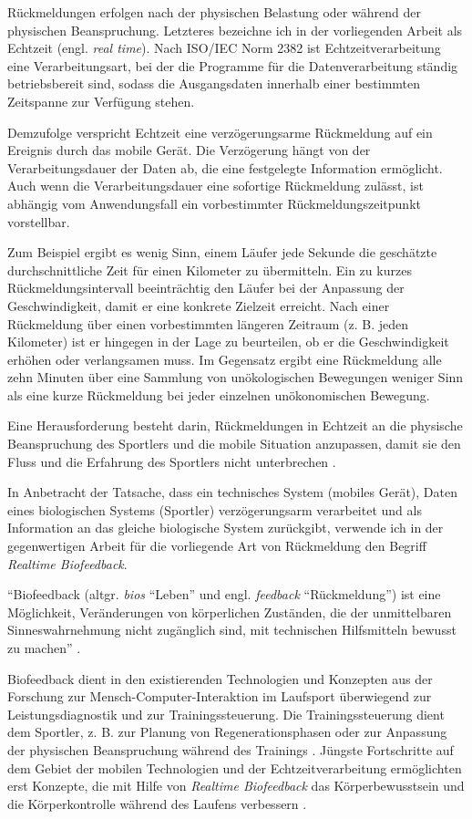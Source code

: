 Rückmeldungen erfolgen nach der physischen Belastung oder während der physischen Beanspruchung. Letzteres bezeichne ich in der vorliegenden Arbeit als Echtzeit (engl. \emph{real time}). Nach ISO/IEC Norm 2382 ist Echtzeitverarbeitung eine Verarbeitungsart, bei der die Programme für die Datenverarbeitung ständig betriebsbereit sind, sodass die Ausgangsdaten innerhalb einer bestimmten Zeitspanne zur Verfügung stehen.

Demzufolge verspricht Echtzeit eine verzögerungsarme Rückmeldung auf ein Ereignis durch das mobile Gerät. Die Verzögerung hängt von der Verarbeitungsdauer der Daten ab, die eine festgelegte Information ermöglicht. Auch wenn die Verarbeitungsdauer eine sofortige Rückmeldung zulässt, ist abhängig vom Anwendungsfall ein vorbestimmter Rückmeldungszeitpunkt vorstellbar.

Zum Beispiel ergibt es wenig Sinn, einem Läufer jede Sekunde die geschätzte durchschnittliche Zeit für einen Kilometer zu übermitteln. Ein zu kurzes Rückmeldungsintervall beeinträchtig den Läufer bei der Anpassung der Geschwindigkeit, damit er eine konkrete Zielzeit erreicht. Nach einer Rückmeldung über einen vorbestimmten längeren Zeitraum (z. B. jeden Kilometer) ist er hingegen in der Lage zu beurteilen, ob er die Geschwindigkeit erhöhen oder verlangsamen muss. Im Gegensatz ergibt eine Rückmeldung alle zehn Minuten über eine Sammlung von unökologischen Bewegungen weniger Sinn als eine kurze Rückmeldung bei jeder einzelnen unökonomischen Bewegung.

Eine Herausforderung besteht darin, Rückmeldungen in Echtzeit an die physische Beanspruchung des Sportlers und die mobile Situation anzupassen, damit sie den Fluss und die Erfahrung des Sportlers nicht unterbrechen \citep[vgl.][]{Nylander2014}.

In Anbetracht der Tatsache, dass ein technisches System (mobiles Gerät), Daten eines biologischen Systems (Sportler) verzögerungsarm verarbeitet und als Information an das gleiche biologische System zurückgibt, verwende ich in der gegenwertigen Arbeit für die vorliegende Art von Rückmeldung den Begriff \emph{Realtime Biofeedback}.

"`Biofeedback (altgr. \emph{bios} "`Leben"' und engl. \emph{feedback} "`Rückmeldung"') ist eine Möglichkeit, Veränderungen von körperlichen Zuständen, die der unmittelbaren Sinneswahrnehmung nicht zugänglich sind, mit technischen Hilfsmitteln bewusst zu machen"' \citep[][S.~483]{Riemer2015}.

Biofeedback dient in den existierenden Technologien und Konzepten aus der Forschung zur Mensch-Computer-Interaktion im Laufsport überwiegend zur Leistungsdiagnostik und zur Trainingssteuerung. Die Trainingssteuerung dient dem Sportler, z. B. zur Planung von Regenerationsphasen oder zur Anpassung der physischen Beanspruchung während des Trainings \citep[vgl.][S.~81-107]{Marquardt2011}. Jüngste Fortschritte auf dem Gebiet der mobilen Technologien und der Echtzeitverarbeitung ermöglichten erst Konzepte, die mit Hilfe von \emph{Realtime Biofeedback} das Körperbewusstsein und die Körperkontrolle während des Laufens verbessern \citep[z. B.][]{Strohrmann2013, Strohrmann2013a, Strohrmann2014}.

